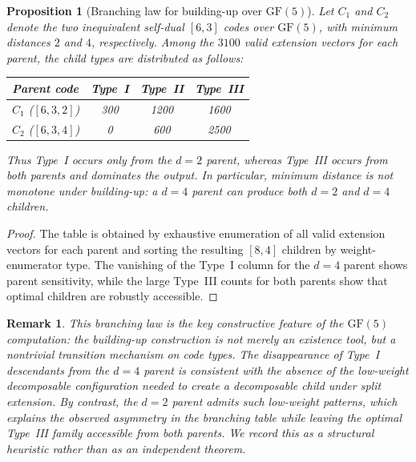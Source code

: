 \documentclass[12pt]{article}
\newtheorem{prop}[theorem]{Proposition}
\newtheorem{remark}[theorem]{Remark}
\newcommand{\GF}[1]{\ensuremath{\mathrm{GF}(#1)}}
\newenvironment{blueblock}{\begingroup\color{blue}}{\endgroup}
\begin{document}
\begin{blueblock}
\begin{prop}[Branching law for building-up over $\GF{5}$]
\label{prop:branching-gf5}
Let $C_1$ and $C_2$ denote the two inequivalent self-dual $[6,3]$ codes over $\GF{5}$, with minimum distances $2$ and $4$, respectively. Among the $3100$ valid extension vectors for each parent, the child types are distributed as follows:
\begin{center}
\begin{tabular}{lccc}
\toprule
Parent code & Type~I & Type~II & Type~III \\
\midrule
$C_1$ ($[6,3,2]$) & 300 & 1200 & 1600 \\
$C_2$ ($[6,3,4]$) & 0 & 600 & 2500 \\
\bottomrule
\end{tabular}
\end{center}
Thus Type~I occurs only from the $d=2$ parent, whereas Type~III occurs from both parents and dominates the output. In particular, minimum distance is not monotone under building-up: a $d=4$ parent can produce both $d=2$ and $d=4$ children.
\end{prop}

\begin{proof}
The table is obtained by exhaustive enumeration of all valid extension vectors for each parent and sorting the resulting $[8,4]$ children by weight-enumerator type. The vanishing of the Type~I column for the $d=4$ parent shows parent sensitivity, while the large Type~III counts for both parents show that optimal children are robustly accessible.
\end{proof}

\begin{remark}
{\rm
This branching law is the key constructive feature of the $\GF{5}$ computation: the building-up construction is not merely an existence tool, but a nontrivial transition mechanism on code types. The disappearance of Type~I descendants from the $d=4$ parent is consistent with the absence of the low-weight decomposable configuration needed to create a decomposable child under split extension. By contrast, the $d=2$ parent admits such low-weight patterns, which explains the observed asymmetry in the branching table while leaving the optimal Type~III family accessible from both parents. We record this as a structural heuristic rather than as an independent theorem.
}
\end{remark}
\end{blueblock}
\end{document}
